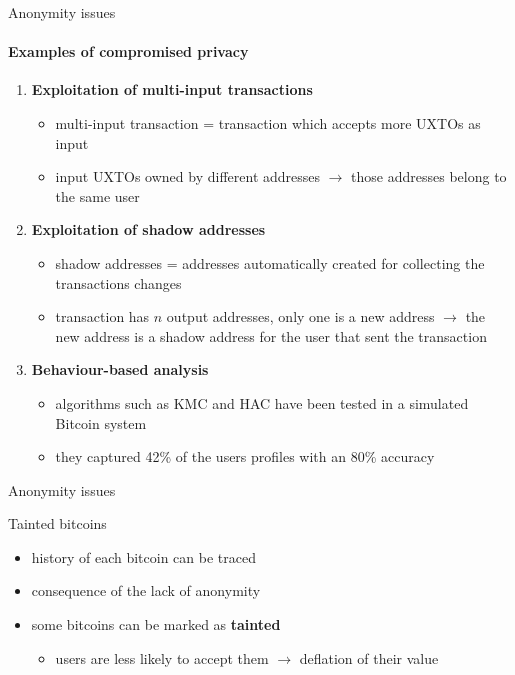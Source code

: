 \documentclass{beamer}
\begin{document}
  
  
  \begin{frame}{Anonymity issues}
  \framesubtitle{Examples of compromised privacy}
      \begin{enumerate}
          \item \textbf{Exploitation of multi-input transactions}
          \begin{itemize}
              \item multi-input transaction = transaction which accepts more UXTOs as input
              \item input UXTOs owned by different addresses $\rightarrow$ those addresses belong to the same user
          \end{itemize}
          \pause
          \item \textbf{Exploitation of shadow addresses}
          \begin{itemize}
              \item shadow addresses = addresses automatically created for collecting the transactions changes
              \item transaction has $n$ output addresses, only one is a new address $\rightarrow$ the new address is a shadow address for the user that sent the transaction
          \end{itemize}
          \pause
          \item \textbf{Behaviour-based analysis}
          \begin{itemize}
              \item algorithms such as KMC and HAC have been tested in a simulated Bitcoin system \cite{androulaki2013evaluating}
              \item they captured 42\% of the users profiles with an 80\% accuracy
          \end{itemize}
      \end{enumerate}
  \end{frame}
  
  
  
  \begin{frame}{Anonymity issues}
      \begin{block}{Tainted bitcoins}
        \begin{itemize}
            \item history of each bitcoin can be traced
            \item consequence of the lack of anonymity
            \item some bitcoins can be marked as \textbf{tainted}
            \begin{itemize}
                \item users are less likely to accept them $\rightarrow$ deflation of their value
            \end{itemize}
        \end{itemize}
      \end{block}
  \end{frame}
  
\end{document}
